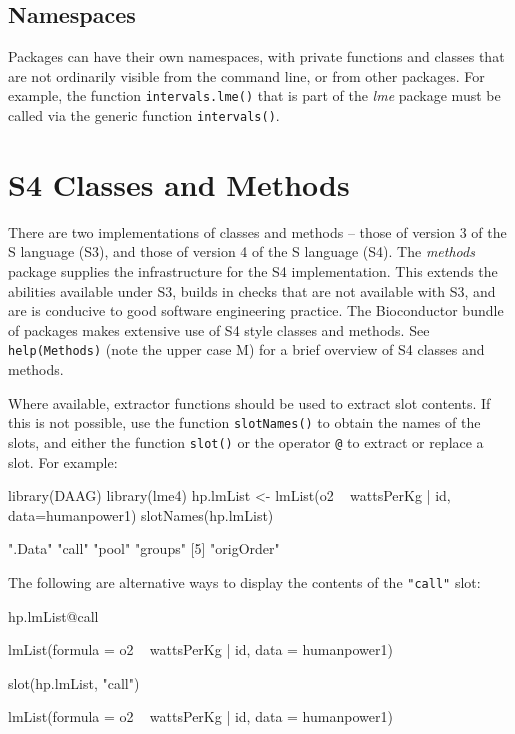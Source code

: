 \documentclass{tufte-book}\usepackage[]{graphicx}\usepackage[]{color}
\newcommand{\txtt}[1]{\texttt{#1}}
\begin{document}
\subsection*{Namespaces}
Packages can have their own namespaces, with private functions and
classes that are not ordinarily visible from the command line, or from
other packages.  For example, the function \txtt{intervals.lme()}
that is part of the \textit{lme} package must be called via the generic
function \txtt{intervals()}.

\section{S4 Classes and Methods}\label{sec:s4}
There are two implementations of classes and methods -- those of
version 3 of the S language (S3), and those of version 4 of the S
language (S4).  The \textit{methods} package supplies the
infrastructure for the S4 implementation. This extends the abilities
available under S3, builds in checks that are not available with S3,
and are is conducive to good software engineering practice.  The
Bioconductor bundle of packages makes extensive use of S4 style
classes and methods. See \txtt{help(Methods)} (note the upper case M)
for a brief overview of S4 classes and methods.

Where available, extractor functions should be used to extract slot
contents. If this is not possible, use the function
\txtt{slotNames()} to obtain the names of the slots, and either the
function \txtt{slot()} or the operator \verb!@! to extract or
replace a slot.  For example:
\begin{Schunk}
\begin{Sinput}
library(DAAG)
library(lme4)
hp.lmList <- lmList(o2 ~ wattsPerKg | id,
                    data=humanpower1)
slotNames(hp.lmList)
\end{Sinput}
\begin{Soutput}
[1] ".Data"     "call"      "pool"      "groups"   
[5] "origOrder"
\end{Soutput}
\end{Schunk}

The following are alternative ways to display the contents of the
\txtt{"call"} slot:
\begin{fullwidth}
\begin{Schunk}
\begin{Sinput}
hp.lmList@call
\end{Sinput}
\begin{Soutput}
lmList(formula = o2 ~ wattsPerKg | id, data = humanpower1)
\end{Soutput}
\begin{Sinput}
slot(hp.lmList, "call")
\end{Sinput}
\begin{Soutput}
lmList(formula = o2 ~ wattsPerKg | id, data = humanpower1)
\end{Soutput}
\end{Schunk}
\end{fullwidth}
\end{document}
